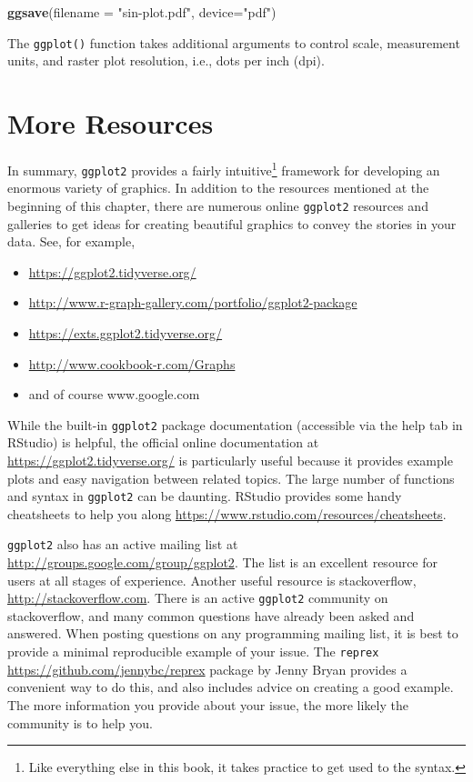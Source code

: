\documentclass[
]{krantz}
\newenvironment{Shaded}{\begin{snugshade}}{\end{snugshade}}
\newcommand{\DataTypeTok}[1]{\textcolor[rgb]{0.13,0.29,0.53}{#1}}
\newcommand{\KeywordTok}[1]{\textcolor[rgb]{0.13,0.29,0.53}{\textbf{#1}}}
\newcommand{\NormalTok}[1]{#1}
\newcommand{\StringTok}[1]{\textcolor[rgb]{0.31,0.60,0.02}{#1}}
\providecommand{\tightlist}{%
  \setlength{\itemsep}{0pt}\setlength{\parskip}{0pt}}
\begin{document}
\begin{Shaded}
\begin{Highlighting}[]
\KeywordTok{ggsave}\NormalTok{(}\DataTypeTok{filename =} \StringTok{"sin{-}plot.pdf"}\NormalTok{, }\DataTypeTok{device=}\StringTok{"pdf"}\NormalTok{)}
\end{Highlighting}
\end{Shaded}

The \texttt{ggplot()} function takes additional arguments to control scale, measurement units, and raster plot resolution, i.e., dots per inch (dpi).

\hypertarget{more-resources}{%
\section{More Resources}\label{more-resources}}

In summary, \texttt{ggplot2} provides a fairly intuitive\footnote{Like everything else in this book, it takes practice to get used to the syntax.} framework for developing an enormous variety of graphics. In addition to the resources mentioned at the beginning of this chapter, there are numerous online \texttt{ggplot2} resources and galleries to get ideas for creating beautiful graphics to convey the stories in your data. See, for example,

\begin{itemize}
\tightlist
\item
  \url{https://ggplot2.tidyverse.org/}
\item
  \url{http://www.r-graph-gallery.com/portfolio/ggplot2-package}
\item
  \url{https://exts.ggplot2.tidyverse.org/}
\item
  \url{http://www.cookbook-r.com/Graphs}
\item
  and of course www.google.com
\end{itemize}

While the built-in \texttt{ggplot2} package documentation (accessible via the help tab in RStudio) is helpful, the official online documentation at \url{https://ggplot2.tidyverse.org/} is particularly useful because it provides example plots and easy navigation between related topics. The large number of functions and syntax in \texttt{ggplot2} can be daunting. RStudio provides some handy cheatsheets to help you along \url{https://www.rstudio.com/resources/cheatsheets}.

\texttt{ggplot2} also has an active mailing list at \url{http://groups.google.com/group/ggplot2}. The list is an excellent resource for users at all stages of experience. Another useful resource is stackoverflow, \url{http://stackoverflow.com}. There is an active \texttt{ggplot2} community on stackoverflow, and many common questions have already been asked and answered. When posting questions on any programming mailing list, it is best to provide a minimal reproducible example of your issue. The \texttt{reprex} \url{https://github.com/jennybc/reprex} package by Jenny Bryan provides a convenient way to do this, and also includes advice on creating a good example. The more information you provide about your issue, the more likely the community is to help you.
\end{document}
